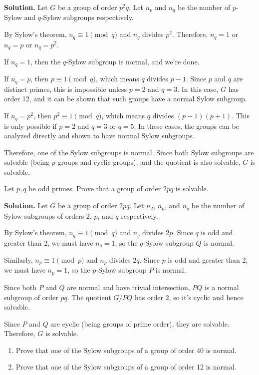 \noindent\textbf{Solution.} Let $G$ be a group of order $p^2q$. Let $n_p$ and $n_q$ be the number of $p$-Sylow and $q$-Sylow subgroups respectively.

By Sylow's theorem, $n_q \equiv 1 \pmod{q}$ and $n_q$ divides $p^2$. Therefore, $n_q = 1$ or $n_q = p$ or $n_q = p^2$.

If $n_q = 1$, then the $q$-Sylow subgroup is normal, and we're done.

If $n_q = p$, then $p \equiv 1 \pmod{q}$, which means $q$ divides $p-1$. Since $p$ and $q$ are distinct primes, this is impossible unless $p = 2$ and $q = 3$. In this case, $G$ has order 12, and it can be shown that such groups have a normal Sylow subgroup.

If $n_q = p^2$, then $p^2 \equiv 1 \pmod{q}$, which means $q$ divides $(p-1)(p+1)$. This is only possible if $p = 2$ and $q = 3$ or $q = 5$. In these cases, the groups can be analyzed directly and shown to have normal Sylow subgroups.

Therefore, one of the Sylow subgroups is normal. Since both Sylow subgroups are solvable (being $p$-groups and cyclic groups), and the quotient is also solvable, $G$ is solvable.

\begin{problembox}
Let $p, q$ be odd primes. Prove that a group of order $2pq$ is solvable.
\end{problembox}

\noindent\textbf{Solution.} Let $G$ be a group of order $2pq$. Let $n_2$, $n_p$, and $n_q$ be the number of Sylow subgroups of orders 2, $p$, and $q$ respectively.

By Sylow's theorem, $n_q \equiv 1 \pmod{q}$ and $n_q$ divides $2p$. Since $q$ is odd and greater than 2, we must have $n_q = 1$, so the $q$-Sylow subgroup $Q$ is normal.

Similarly, $n_p \equiv 1 \pmod{p}$ and $n_p$ divides $2q$. Since $p$ is odd and greater than 2, we must have $n_p = 1$, so the $p$-Sylow subgroup $P$ is normal.

Since both $P$ and $Q$ are normal and have trivial intersection, $PQ$ is a normal subgroup of order $pq$. The quotient $G/PQ$ has order 2, so it's cyclic and hence solvable.

Since $P$ and $Q$ are cyclic (being groups of prime order), they are solvable. Therefore, $G$ is solvable.

\begin{problembox}
\begin{enumerate}[label=(\alph*)]
\item Prove that one of the Sylow subgroups of a group of order 40 is normal.
\item Prove that one of the Sylow subgroups of a group of order 12 is normal.
\end{enumerate}
\end{problembox}

